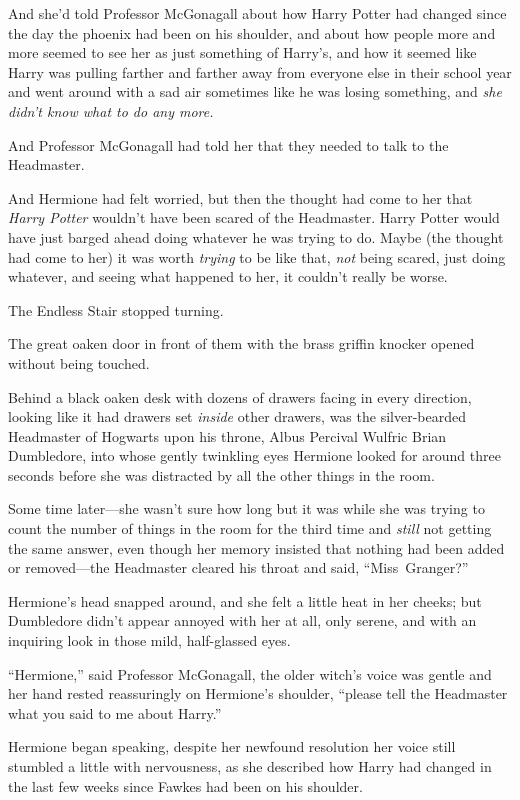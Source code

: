 And she’d told Professor McGonagall about how Harry Potter had changed since the day the phoenix had been on his shoulder, and about how people more and more seemed to see her as just something of Harry’s, and how it seemed like Harry was pulling farther and farther away from everyone else in their school year and went around with a sad air sometimes like he was losing something, and \emph{she didn’t know what to do any more.}

And Professor McGonagall had told her that they needed to talk to the Headmaster.

And Hermione had felt worried, but then the thought had come to her that \emph{Harry Potter} wouldn’t have been scared of the Headmaster. Harry Potter would have just barged ahead doing whatever he was trying to do. Maybe (the thought had come to her) it was worth \emph{trying} to be like that, \emph{not} being scared, just doing whatever, and seeing what happened to her, it couldn’t really be worse.

The Endless Stair stopped turning.

The great oaken door in front of them with the brass griffin knocker opened without being touched.

Behind a black oaken desk with dozens of drawers facing in every direction, looking like it had drawers set \emph{inside} other drawers, was the silver-bearded Headmaster of Hogwarts upon his throne, Albus Percival Wulfric Brian Dumbledore, into whose gently twinkling eyes Hermione looked for around three seconds before she was distracted by all the other things in the room.

Some time later—she wasn’t sure how long but it was while she was trying to count the number of things in the room for the third time and \emph{still} not getting the same answer, even though her memory insisted that nothing had been added or removed—the Headmaster cleared his throat and said, “Miss~Granger?”

Hermione’s head snapped around, and she felt a little heat in her cheeks; but Dumbledore didn’t appear annoyed with her at all, only serene, and with an inquiring look in those mild, half-glassed eyes.

“Hermione,” said Professor McGonagall, the older witch’s voice was gentle and her hand rested reassuringly on Hermione’s shoulder, “please tell the Headmaster what you said to me about Harry.”

Hermione began speaking, despite her newfound resolution her voice still stumbled a little with nervousness, as she described how Harry had changed in the last few weeks since Fawkes had been on his shoulder.

